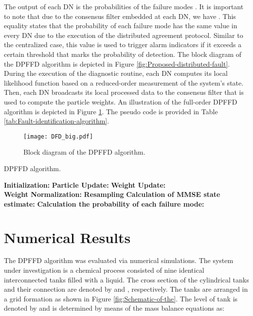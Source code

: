 \documentclass[10pt,twocolumn,twoside]{IEEEtran}
\begin{document}
The output of each DN is the probabilities of the failure modes .
It is important to note that due to the consensus filter embedded
at each DN, we have .
This equality states that the probability of each failure mode has
the same value in every DN due to the execution of the distributed
agreement protocol. Similar to the centralized case, this value is
used to trigger alarm indicators if it exceeds a certain threshold
 that marks the probability of detection.
The block diagram of the DPFFD algorithm is depicted in Figure \ref{fig:Proposed-distributed-fault}.
During the execution of the diagnostic routine, each DN computes its
local likelihood function based on a reduced-order measurement of
the system's state. Then, each DN broadcasts its local processed data
to the consensus filter that is used to compute the particle weights.
An illustration of the full-order DPFFD algorithm is depicted in Figure
\ref{fig:Schematic-of-distributed}. The pseudo code is provided in Table \ref{tab:Fault-identification-algorithm}.

\begin{figure}
\centering{}\texttt{[image: DFD\_big.pdf]}\caption{Block diagram of the DPFFD algorithm. \label{fig:Schematic-of-distributed}}
\end{figure}

\begin{table}
\caption{DPFFD algorithm. \label{tab:Fault-identification-algorithm}}
\begin{algorithmic}[1]
\For {}
\Statex \textbf{Initialization:}
\State 
\State 
\Statex \textbf{Particle Update:}
\State 
\Statex \textbf{Weight Update:}
\State 
\State \\
\Statex 
\Statex \textbf{Weight Normalization:}
\State 
\Statex \textbf{Resampling}
\Statex \textbf{Calculation of MMSE state estimate:}
\State 
\Statex \textbf{Calculation the probability of each failure mode:}
\For {}
\State 
\EndFor

\EndFor
\end{algorithmic}
\end{table}

\section{Numerical Results}\label{sec:Numerical-Results}

The DPFFD algorithm was evaluated via numerical simulations. The system
under investigation is a chemical process consisted of nine identical
interconnected tanks filled with a liquid. The cross section of the
cylindrical tanks and their connection are denoted by  and
, respectively. The tanks are arranged in a grid formation
as shown in Figure \ref{fig:Schematic-of-the}. The level of tank
 is denoted by  and is determined by means of the mass
balance equations as:
\end{document}
